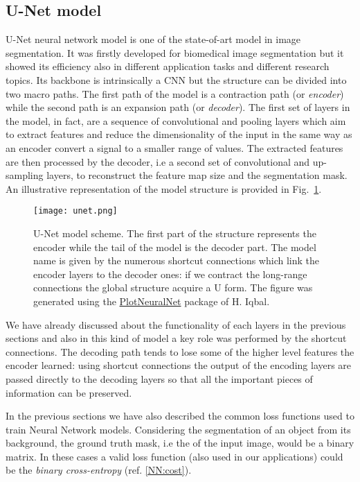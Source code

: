 \documentclass{standalone}
\begin{document}
\subsection[U-Net model]{U-Net model}\label{segmentation:Unet}

U-Net neural network model is one of the state-of-art model in image segmentation.
It was firstly developed for biomedical image segmentation but it showed its efficiency also in different application tasks and different research topics.
Its backbone is intrinsically a  CNN but the structure can be divided into two macro paths.
The first path of the model is a contraction path (or \emph{encoder}) while the second path is an expansion path (or \emph{decoder}).
The first set of layers in the model, in fact, are a sequence of convolutional and pooling layers which aim to extract features and reduce the dimensionality of the input in the same way as an encoder convert a signal to a smaller range of values.
The extracted features are then processed by the decoder, i.e a second set of convolutional and up-sampling layers, to reconstruct the feature map size and the segmentation mask.
An illustrative representation of the model structure is provided in Fig.~\ref{fig:unet}.

\begin{center}
\begin{figure}[htbp]
\centering
\texttt{[image: unet.png]}
\caption{U-Net model scheme.
The first part of the structure represents the encoder while the tail of the model is the decoder part.
The model name is given by the numerous shortcut connections which link the encoder layers to the decoder ones: if we contract the long-range connections the global structure acquire a U form.
The figure was generated using the \href{https://github.com/HarisIqbal88/PlotNeuralNet}{PlotNeuralNet} package of H. Iqbal.
}
\label{fig:unet}
\end{figure}
\end{center}

We have already discussed about the functionality of each layers in the previous sections and also in this kind of model a key role was performed by the shortcut connections.
The decoding path tends to lose some of the higher level features the encoder learned: using shortcut connections the output of the encoding layers are passed directly to the decoding layers so that all the important pieces of information can be preserved.

In the previous sections we have also described the common loss functions used to train Neural Network models.
Considering the  segmentation of an object from its background, the ground truth mask, i.e the  of the input image, would be a binary matrix.
In these cases a valid loss function (also used in our applications) could be the \emph{binary cross-entropy} (ref. \ref{NN:cost}).
\end{document}
